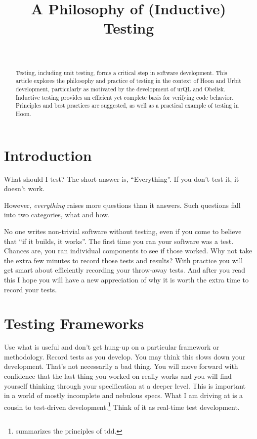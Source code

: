 \documentclass[twoside]{article}
\title{A Philosophy of (Inductive) Testing}
\author{\authorname~\authorpatp \\ \affiliation}
\date{}
\begin{document}
\maketitle
\thispagestyle{firststyle}

\begin{abstract}
  \noindent
  Testing, including unit testing, forms a critical step in software development.  This article explores the philosophy and practice of testing in the context of Hoon and Urbit development, particularly as motivated by the development of urQL and Obelisk.  Inductive testing provides an efficient yet complete basis for verifying code behavior.  Principles and best practices are suggested, as well as a practical example of testing in Hoon.
\end{abstract}

\setcounter{page}{59}

\tableofcontents

\section{Introduction}

What should I test?  The short answer is, “Everything”.  If you don't test it, it doesn't work.

However, \emph{everything} raises more questions than it answers. Such questions fall into two categories, what and how.

No one writes non-trivial software without testing, even if you come to believe that “if it builds, it works”. The first time you ran your software was a test. Chances are, you ran individual components to see if those worked. Why not take the extra few minutes to record those tests and results? With practice you will get smart about efficiently recording your throw-away tests. And after you read this I hope you will have a new appreciation of why it is worth the extra time to record your tests.

\section{Testing Frameworks}

Use what is useful and don't get hung-up on a particular framework or methodology. Record tests as you develop. You may think this slows down your development. That's not necessarily a bad thing. You will move forward with confidence that the last thing you worked on really works and you will find yourself thinking through your specification at a deeper level. This is important in a world of mostly incomplete and nebulous specs. What I am driving at is a cousin to test-driven development.\footnote{\citet{Beck2023} summarizes the principles of {\sc tdd}.} Think of it as real-time test development.
\end{document}
